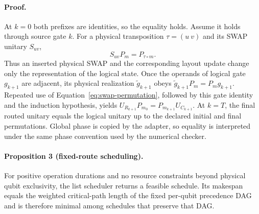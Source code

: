 \documentclass[conference]{IEEEtran}
\begin{document}
\paragraph{Proof.}
At $k=0$ both prefixes are identities, so the equality holds. Assume it holds
through source gate $k$. For a physical transposition $\tau=(u\ v)$ and its
SWAP unitary $S_{uv}$,
{\large
\begin{equation}
 S_{uv}P_m=P_{\tau\circ m}.
 \label{eq:swap-permutation}
\end{equation}
}
Thus an inserted physical SWAP and the corresponding layout update change only
the representation of the logical state. Once the operands of logical gate
$g_{k+1}$ are adjacent, its physical realization $\widetilde g_{k+1}$ obeys
$\widetilde g_{k+1}P_m=P_m g_{k+1}$. Repeated use of
Equation~\eqref{eq:swap-permutation}, followed by this gate identity and the
induction hypothesis, yields
$U_{R_{k+1}}P_{m_0}=P_{m_{k+1}}U_{C_{k+1}}$. At $k=T$, the final routed
unitary equals the logical unitary up to the declared initial and final
permutations. Global phase is copied by the adapter, so equality is interpreted
under the same phase convention used by the numerical checker.

\paragraph{Proposition 3 (fixed-route scheduling).}
For positive operation durations and no resource constraints beyond physical
qubit exclusivity, the list scheduler returns a feasible schedule. Its
makespan equals the weighted critical-path length of the fixed per-qubit
precedence DAG and is therefore minimal among schedules that preserve that DAG.
\end{document}
